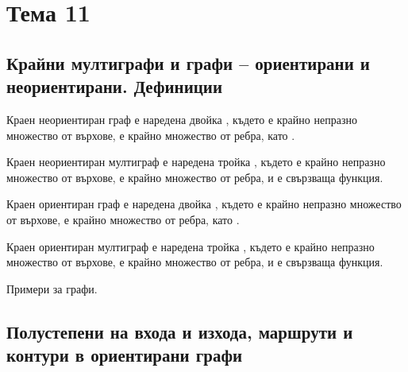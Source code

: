 \section{Тема 11}

\subsection{Крайни мултиграфи и графи – ориентирани и неориентирани. Дефиниции}

\begin{definition}
    Краен неориентиран граф е наредена двойка , където  е 
    крайно непразно множество от върхове,  е крайно множество от ребра, като 
    .
\end{definition}

\begin{definition}
    Краен неориентиран мултиграф е наредена тройка , където 
     е крайно непразно множество от върхове,  
    е крайно множество от ребра,  и  
    е свързваща функция.
\end{definition}

\begin{definition}
    Краен ориентиран граф е наредена двойка , където  е 
    крайно непразно множество от върхове,  е крайно множество от ребра, като 
    .
\end{definition}

\begin{definition}
    Краен ориентиран мултиграф е наредена тройка , където 
     е крайно непразно множество от върхове,  
    е крайно множество от ребра,  и  
    е свързваща функция.
\end{definition}

\begin{note}
    Примери за графи.
\end{note}

\subsection{Полустепени на входа и изхода, маршрути и контури в ориентирани графи}

